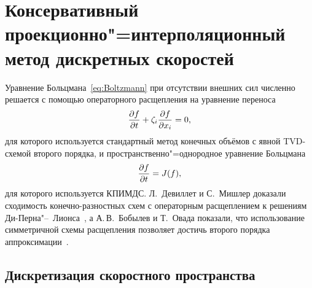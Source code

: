 \section{Консервативный проекционно"=интерполяционный метод дискретных скоростей} \label{sect:method}

Уравнение Больцмана~\eqref{eq:Boltzmann} при отсутствии внешних сил
численно решается с помощью операторного расщепления на уравнение переноса
\begin{equation}\label{eq:split_transport}
    \pder[f]{t} + \zeta_i\pder[f]{x_i} = 0,
\end{equation}
для которого используется стандартный метод конечных объёмов с явной TVD-схемой второго порядка,
и пространственно"=однородное уравнение Больцмана
\begin{equation}\label{eq:split_collisions}
    \pder[f]{t} = J(f),
\end{equation}
для которого используется КПИМДС.
Л.~Девиллет и С.~Мишлер доказали сходимость конечно-разностных схем с операторным расщеплением
к решениям Ди-Перна"--~Лионса~\cite{Desvillettes1996},
а А.\,В.~Бобылев и Т.~Овада показали, что использование симметричной схемы расщепления позволяет
достичь второго порядка аппроксимации~\cite{Bobylev2001}.

\subsection{Дискретизация скоростного пространства}

